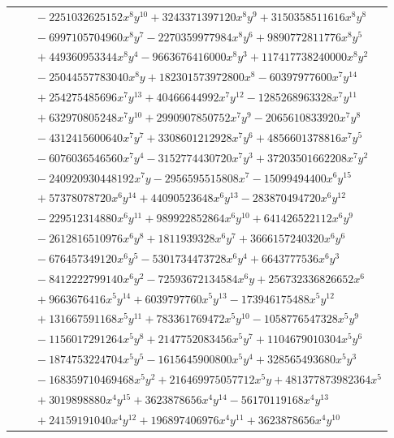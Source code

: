 \documentclass[11pt]{article}
\begin{document}
\begin{longtable}{@{}ll@{}}
 & $\quad -2251032625152x^{8}y^{10}+3243371397120x^{8}y^{9}+3150358511616x^{8}y^{8}$\\
 & $\quad -6997105704960x^{8}y^{7}-2270359977984x^{8}y^{6}+9890772811776x^{8}y^{5}$\\
 & $\quad +449360953344x^{8}y^{4}-9663676416000x^{8}y^{3}+117417738240000x^{8}y^{2}$\\
 & $\quad -25044557783040x^{8}y+182301573972800x^{8}-60397977600x^{7}y^{14}$\\
 & $\quad +254275485696x^{7}y^{13}+40466644992x^{7}y^{12}-1285268963328x^{7}y^{11}$\\
 & $\quad +632970805248x^{7}y^{10}+2990907850752x^{7}y^{9}-2065610833920x^{7}y^{8}$\\
 & $\quad -4312415600640x^{7}y^{7}+3308601212928x^{7}y^{6}+4856601378816x^{7}y^{5}$\\
 & $\quad -6076036546560x^{7}y^{4}-3152774430720x^{7}y^{3}+37203501662208x^{7}y^{2}$\\
 & $\quad -240920930448192x^{7}y-2956595515808x^{7}-15099494400x^{6}y^{15}$\\
 & $\quad +57378078720x^{6}y^{14}+44090523648x^{6}y^{13}-283870494720x^{6}y^{12}$\\
 & $\quad -229512314880x^{6}y^{11}+989922852864x^{6}y^{10}+641426522112x^{6}y^{9}$\\
 & $\quad -2612816510976x^{6}y^{8}+1811939328x^{6}y^{7}+3666157240320x^{6}y^{6}$\\
 & $\quad -676457349120x^{6}y^{5}-5301734473728x^{6}y^{4}+6643777536x^{6}y^{3}$\\
 & $\quad -8412222799140x^{6}y^{2}-72593672134584x^{6}y+256732336826652x^{6}$\\
 & $\quad +9663676416x^{5}y^{14}+6039797760x^{5}y^{13}-173946175488x^{5}y^{12}$\\
 & $\quad +131667591168x^{5}y^{11}+783361769472x^{5}y^{10}-1058776547328x^{5}y^{9}$\\
 & $\quad -1156017291264x^{5}y^{8}+2147752083456x^{5}y^{7}+1104679010304x^{5}y^{6}$\\
 & $\quad -1874753224704x^{5}y^{5}-1615645900800x^{5}y^{4}+328565493680x^{5}y^{3}$\\
 & $\quad -168359710469468x^{5}y^{2}+216469975057712x^{5}y+481377873982364x^{5}$\\
 & $\quad +3019898880x^{4}y^{15}+3623878656x^{4}y^{14}-56170119168x^{4}y^{13}$\\
 & $\quad +24159191040x^{4}y^{12}+196897406976x^{4}y^{11}+3623878656x^{4}y^{10}$\\

\end{longtable}
\end{document}

